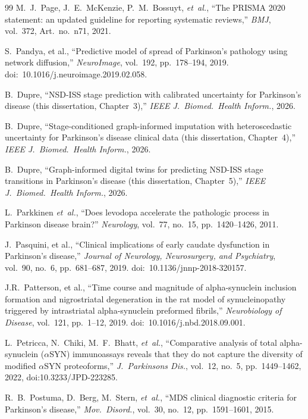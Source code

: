 \begin{thebibliography}{99}
M.~J.~Page, J.~E.~McKenzie, P.~M.~Bossuyt, \textit{et~al.}, ``The PRISMA 2020 statement: an updated guideline for reporting systematic reviews,'' \textit{BMJ}, vol.~372, Art.\ no.~n71, 2021.

S.~Pandya, et al., ``Predictive model of spread of Parkinson's pathology using network diffusion,'' \textit{NeuroImage}, vol.~192, pp.~178--194, 2019. doi:~10.1016/j.neuroimage.2019.02.058.

B.~Dupre, ``NSD-ISS stage prediction with calibrated uncertainty for Parkinson's disease (this dissertation, Chapter~3),'' \textit{IEEE J.\ Biomed.\ Health Inform.}, 2026.

B.~Dupre, ``Stage-conditioned graph-informed imputation with heteroscedastic uncertainty for Parkinson's disease clinical data (this dissertation, Chapter~4),'' \textit{IEEE J.\ Biomed.\ Health Inform.}, 2026.

B.~Dupre, ``Graph-informed digital twins for predicting NSD-ISS stage transitions in Parkinson's disease (this dissertation, Chapter~5),'' \textit{IEEE J.\ Biomed.\ Health Inform.}, 2026.

L.~Parkkinen \textit{et~al.}, ``Does levodopa accelerate the pathologic
process in Parkinson disease brain?'' \textit{Neurology}, vol.~77,
no.~15, pp.~1420--1426, 2011.

J.~Pasquini, et al., ``Clinical implications of early caudate dysfunction in Parkinson's disease,'' \textit{Journal of Neurology, Neurosurgery, and Psychiatry}, vol.~90, no.~6, pp.~681--687, 2019. doi:~10.1136/jnnp-2018-320157.

J.R.~Patterson, et al., ``Time course and magnitude of alpha-synuclein inclusion formation and nigrostriatal degeneration in the rat model of synucleinopathy triggered by intrastriatal alpha-synuclein preformed fibrils,'' \textit{Neurobiology of Disease}, vol.~121, pp.~1--12, 2019. doi:~10.1016/j.nbd.2018.09.001.

L.~Petricca, N.~Chiki, M.~F.~Bhatt, \textit{et~al.}, ``Comparative analysis of total alpha-synuclein ($\alpha$SYN) immunoassays reveals that they do not capture the diversity of modified $\alpha$SYN proteoforms,'' \textit{J.~Parkinsons Dis.}, vol.~12, no.~5, pp.~1449--1462, 2022, doi:10.3233/JPD-223285.

R.~B.~Postuma, D.~Berg, M.~Stern, \textit{et~al.}, ``MDS clinical diagnostic criteria for Parkinson's disease,'' \textit{Mov.\ Disord.}, vol.~30, no.~12, pp.~1591--1601, 2015.


\end{thebibliography}
